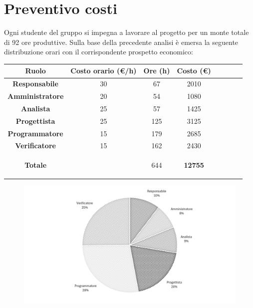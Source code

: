 \section{Preventivo costi}

Ogni studente del gruppo si impegna a lavorare al progetto per un monte totale di 92 ore
produttive. Sulla base della precedente analisi è emersa la seguente distribuzione orari con il corrispondente prospetto economico:

\begin{table}[H]
    \centering
    \renewcommand{\arraystretch}{1.5}
    \begin{tabular}{|>{\bfseries}c|c|c|c|c|c|c|>{\bfseries}c|}
        \hline
        \rowcolor{gray!70} 
        \color{white}\textbf{Ruolo} & \color{white}\textbf{Costo orario (\euro/h)} & \color{white}\textbf{Ore (h)} & \color{white}\textbf{Costo (\euro)} \\
        \hline
        \color{black}\textbf{Responsabile} & 30 & 67 & 2010  \\ 
        \hline
        \rowcolor{gray!10} %
        \color{black}\textbf{Amministratore} & 20 & 54 & 1080 \\ 
        \hline
        \color{black}\textbf{Analista} & 25 & 57 & 1425  \\ 
        \hline
        \rowcolor{gray!10} %
        \color{black}\textbf{Progettista} & 25 & 125 & 3125  \\ 
        \hline
         \color{black}\textbf{Programmatore} & 15 & 179 & 2685 \\ 
        \hline
        \rowcolor{gray!10} %
        \color{black}\textbf{Verificatore} & 15 & 162 & 2430 \\ 
        \hline

        \rowcolor{gray!70} 
        \color{white}\textbf{Totale} & \color{white} & \color{white}644 &  \cellcolor{black}\color{white}\textbf{12755}  \\ 
        \hline
    \end{tabular}


\end{table}

\begin{figure}[H]
    \centering
    \includegraphics[width=\textwidth]{./images/piechart.png}
\end{figure}